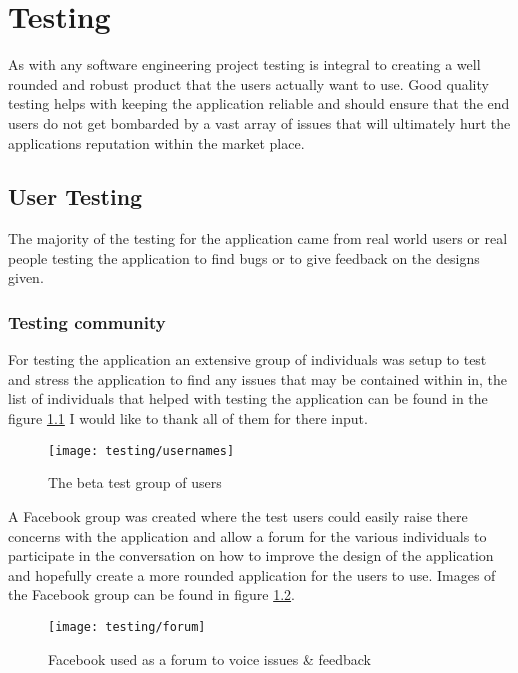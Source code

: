 \chapter{Testing}

As with any software engineering project testing is integral to creating a well rounded and robust product that the users actually want to use. Good quality testing helps with keeping the application reliable and should ensure that the end users do not get bombarded by a vast array of issues that will ultimately hurt the applications reputation within the market place.

\section{User Testing}

The majority of the testing for the application came from real world users or real people testing the application to find bugs or to give feedback on the designs given.

\subsection{Testing community}

For testing the application an extensive group of individuals was setup to test and stress the application to find any issues that may be contained within in, the list of individuals that helped with testing the application can be found in the figure \ref{fig:test_users} I would like to thank all of them for there input.

\begin{figure}[H]
    \centering
    \texttt{[image: testing/usernames]}
    \caption{The beta test group of users}
    \label{fig:test_users}
\end{figure}

\noindent
A Facebook group was created where the test users could easily raise there concerns with the application and allow a forum for the various individuals to participate in the conversation on how to improve the design of the application and hopefully create a more rounded application for the users to use. Images of the Facebook group can be found in figure \ref{fig:facebook_group}.

\begin{figure}[H]
    \centering
    \texttt{[image: testing/forum]}
    \caption{Facebook used as a forum to voice issues \& feedback}
    \label{fig:facebook_group}
\end{figure} 

